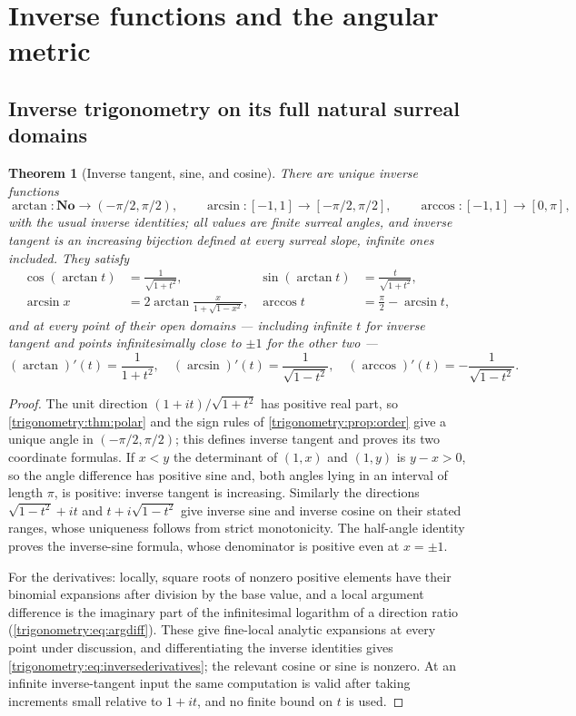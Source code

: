 \documentclass[11pt,letterpaper]{article}
\numberwithin{equation}{section}
\newtheorem{theorem}{Theorem}[section]
\theoremstyle{definition}
\theoremstyle{remark}
\newcommand{\No}{\mathbf{No}}
\begin{document}
\section{Inverse functions and the angular metric}\label{trigonometry:sec:inverse}

\subsection{Inverse trigonometry on its full natural surreal domains}
\begin{theorem}[Inverse tangent, sine, and cosine]\label{trigonometry:thm:inverse}
There are unique inverse functions
\[
 \arctan:\No\to(-\pi/2,\pi/2),\qquad
 \arcsin:[-1,1]\to[-\pi/2,\pi/2],\qquad
 \arccos:[-1,1]\to[0,\pi],
\]
with the usual inverse identities; \emph{all values are finite surreal angles}, and inverse tangent
is an increasing bijection defined at every surreal slope, infinite ones included. They satisfy
\begin{align}
 \cos(\arctan t)&=\frac1{\sqrt{1+t^2}},&
 \sin(\arctan t)&=\frac t{\sqrt{1+t^2}},\\
 \arcsin x&=2\arctan\frac x{1+\sqrt{1-x^2}},&
 \arccos t&=\frac\pi2-\arcsin t,
\end{align}
and at every point of their open domains --- including infinite $t$ for inverse tangent and points
infinitesimally close to $\pm1$ for the other two ---
\begin{equation}\label{trigonometry:eq:inversederivatives}
 (\arctan)'(t)=\frac1{1+t^2},\quad
 (\arcsin)'(t)=\frac1{\sqrt{1-t^2}},\quad
 (\arccos)'(t)=-\frac1{\sqrt{1-t^2}} .
\end{equation}
\end{theorem}
\begin{proof}
The unit direction $(1+it)/\sqrt{1+t^2}$ has positive real part, so
\cref{trigonometry:thm:polar} and the sign rules of \cref{trigonometry:prop:order} give a unique
angle in $(-\pi/2,\pi/2)$; this defines inverse tangent and proves its two coordinate formulas. If
$x<y$ the determinant of $(1,x)$ and $(1,y)$ is $y-x>0$, so the angle difference has positive sine
and, both angles lying in an interval of length $\pi$, is positive: inverse tangent is increasing.
Similarly the directions $\sqrt{1-t^2}+it$ and $t+i\sqrt{1-t^2}$ give inverse sine and inverse
cosine on their stated ranges, whose uniqueness follows from strict monotonicity. The half-angle
identity proves the inverse-sine formula, whose denominator is positive even at $x=\pm1$.

For the derivatives: locally, square roots of nonzero positive elements have their binomial
expansions after division by the base value, and a local argument difference is the imaginary part
of the infinitesimal logarithm of a direction ratio (\cref{trigonometry:eq:argdiff}). These give
fine-local analytic expansions at every point under discussion, and differentiating the inverse
identities gives \cref{trigonometry:eq:inversederivatives}; the relevant cosine or sine is nonzero.
At an infinite inverse-tangent input the same computation is valid after taking increments small
relative to $1+it$, and no finite bound on $t$ is used.
\end{proof}
\end{document}
